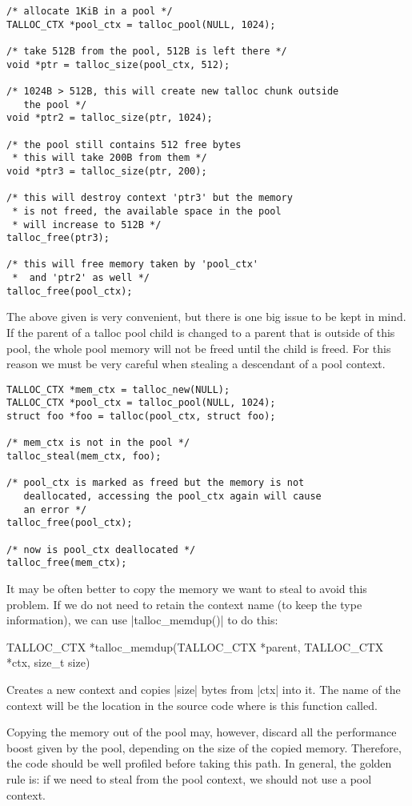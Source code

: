 \begin{lstlisting}[caption={Talloc pool},label=lst:talloc_pool,
morekeywords={talloc_pool}]
/* allocate 1KiB in a pool */
TALLOC_CTX *pool_ctx = talloc_pool(NULL, 1024);

/* take 512B from the pool, 512B is left there */
void *ptr = talloc_size(pool_ctx, 512);

/* 1024B > 512B, this will create new talloc chunk outside
   the pool */
void *ptr2 = talloc_size(ptr, 1024);

/* the pool still contains 512 free bytes
 * this will take 200B from them */
void *ptr3 = talloc_size(ptr, 200);

/* this will destroy context 'ptr3' but the memory
 * is not freed, the available space in the pool
 * will increase to 512B */
talloc_free(ptr3);

/* this will free memory taken by 'pool_ctx'
 *  and 'ptr2' as well */
talloc_free(pool_ctx);
\end{lstlisting}

\noindent
The above given is very convenient, but there is one big issue to be kept in
mind. If the parent of a talloc pool child is changed to a parent that is
outside of this pool, the whole pool memory will not be freed until the child is
freed. For this reason we must be very careful when stealing a descendant of a
pool context.

\begin{lstlisting}[caption={Stealing from pool context},
morekeywords={talloc_pool,talloc_steal,talloc_free}]
TALLOC_CTX *mem_ctx = talloc_new(NULL);
TALLOC_CTX *pool_ctx = talloc_pool(NULL, 1024);
struct foo *foo = talloc(pool_ctx, struct foo);

/* mem_ctx is not in the pool */
talloc_steal(mem_ctx, foo);

/* pool_ctx is marked as freed but the memory is not
   deallocated, accessing the pool_ctx again will cause
   an error */
talloc_free(pool_ctx);

/* now is pool_ctx deallocated */
talloc_free(mem_ctx);
\end{lstlisting}

\noindent
It may be often better to copy the memory we want to steal to avoid this
problem. If we do not need to retain the context name (to keep the type
information), we can use |talloc_memdup()| to do this:

\begin{funcproto}
TALLOC_CTX *talloc_memdup(TALLOC_CTX *parent,
                          TALLOC_CTX *ctx, size_t size)
\end{funcproto}
\begin{funcdesc}
Creates a new context and copies |size| bytes from |ctx| into it. The name of
the context will be the location in the source code where is this function
called.
\end{funcdesc}
\funclistend
Copying the memory out of the pool may, however, discard all the performance
boost given by the pool, depending on the size of the copied memory. Therefore,
the code should be well profiled before taking this path. In general, the
golden rule is: if we need to steal from the pool context, we should not
use a pool context.
